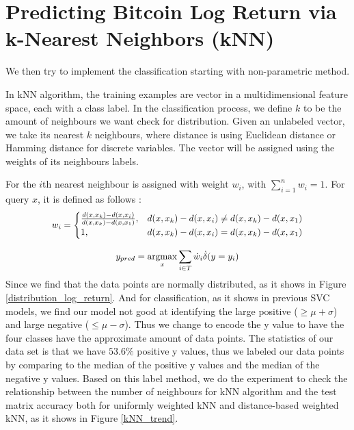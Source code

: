 \documentclass[9pt,twocolumn,twoside]{ilcss}
\newcommand\scalemath[2]{\scalebox{#1}{\mbox{\ensuremath{\displaystyle #2}}}}
\DeclareMathOperator*{\argmax}{argmax}
\begin{document}
\section{Predicting Bitcoin Log Return via k-Nearest Neighbors (kNN)}

We then try to implement the classification starting with non-parametric method.

In kNN algorithm, the training examples are vector in a multidimensional feature space, each with a class label. In the classification process, we define $k$ to be the amount of neighbours we want check for distribution. Given an unlabeled vector, we take its nearest $k$ neighbours, where distance is using Euclidean distance or Hamming distance for discrete variables. The vector will be assigned using the weights of its neighbours labels.

For the $i$th nearest neighbour is assigned with weight $w_{i}$, with $\sum_{i=1}^n w_{i} = 1$. For query $x$, it is defined as follows \cite{samworth2012optimal}:
\[
\scalemath{0.95}{
w_{i}=
\begin{cases}
\frac{d(x,x_{k})-d(x,x_{i})}{d(x,x_{k})-d(x,x_{1})}, & d(x,x_{k})-d(x,x_{i}) \neq d(x,x_{k})-d(x,x_{1})\\
1, & d(x,x_{k})-d(x,x_{i}) = d(x,x_{k})-d(x,x_{1})
\end{cases}
}
\]

\[
\scalemath{0.95}{
y_{pred} = \argmax_x\sum_{i \in T}\dot w_{i} \dot \delta(y=y_{i})
}
\]
Since we find that the data points are normally distributed, as it shows in Figure \ref{distribution_log_return}. And for classification, as it shows in previous SVC models, we find our model not good at identifying the large positive ($\geq \mu + \sigma$) and large negative ($\leq \mu - \sigma$). Thus we change to encode the y value to have the four classes have the approximate amount of data points. The statistics of our data set is that we have $53.6\%$ positive y values, thus we labeled our data points by comparing to the median of the positive y values and the median of the negative y values. Based on this label method, we do the experiment to check the relationship between the number of neighbours for kNN algorithm and the test matrix accuracy both for uniformly weighted kNN and distance-based weighted kNN, as it shows in Figure \ref{kNN_trend}.
\end{document}
